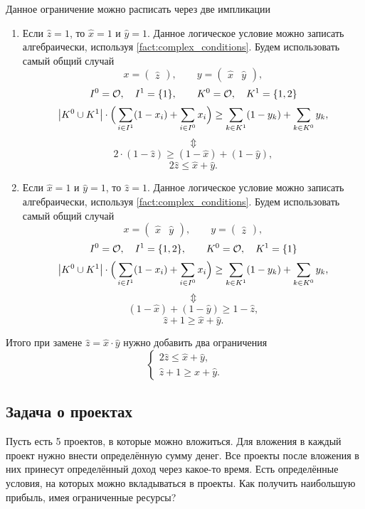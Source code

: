 Данное ограничение можно расписать через две импликации
\begin{enumerate}
	\item Если $\hat{z} = 1$, то $\hat{x} = 1$ и $\hat{y} = 1$. Данное логическое условие можно записать алгебраически, используя \cref{fact:complex_conditions}. Будем использовать самый общий случай
	\[
	x = \begin{pmatrix}\hat{z}\end{pmatrix}, \qquad y = \begin{pmatrix} \hat{x} & \hat{y} \end{pmatrix},
	\]
	\[
	I^0 = \mathcal{O}, \quad I^1 = \{1\}, \qquad K^0 = \mathcal{O}, \quad K^1 = \{1, 2\}
	\]
	\[
	\abs{K^0 \cup K^1} \cdot \Big(\sum_{i \in I^1}(1-x_i) + \sum_{i \in I^0}x_i\Big) \ge \sum_{k \in K^1}(1-y_k) + \sum_{k \in K^0}y_k,
	\]	
	\[\Updownarrow\]	
	\[
	2 \cdot (1 - \hat{z}) \ge (1 - \hat{x}) + (1 - \hat{y}),
	\]
	\[
	2\hat{z} \le \hat{x} + \hat{y}.
	\]
	
	\item Если $\hat{x} = 1$ и $\hat{y} = 1$, то $\hat{z} = 1$. Данное логическое условие можно записать алгебраически, используя \cref{fact:complex_conditions}. Будем использовать самый общий случай
	\[
	x = \begin{pmatrix}\hat{x} & \hat{y}\end{pmatrix}, \qquad y = \begin{pmatrix} \hat{z} \end{pmatrix},
	\]
	\[
	I^0 = \mathcal{O}, \quad I^1 = \{1, 2\}, \qquad K^0 = \mathcal{O}, \quad K^1 = \{1\}
	\]
	\[
	\abs{K^0 \cup K^1} \cdot \Big(\sum_{i \in I^1}(1-x_i) + \sum_{i \in I^0}x_i\Big) \ge \sum_{k \in K^1}(1-y_k) + \sum_{k \in K^0}y_k,
	\]
	\[\Updownarrow\]
	\[
	(1 - \hat{x}) + (1 - \hat{y}) \ge 1 - \hat{z},
	\]
	\[
	\hat{z} + 1 \ge \hat{x} + \hat{y}.
	\]
\end{enumerate}

Итого при замене $\hat{z} = \hat{x} \cdot \hat{y}$ нужно добавить два ограничения
\[
\boxed{\begin{cases}
		2\hat{z} \le \hat{x} + \hat{y}, \\
		\hat{z} + 1 \ge \hat{x} + \hat{y}.
\end{cases}}
\]

\subsection{Задача о проектах}

Пусть есть 5 проектов, в которые можно вложиться. Для вложения в каждый проект нужно внести определённую сумму денег. Все проекты после вложения в них принесут определённый доход через какое-то время. Есть определённые условия, на которых можно вкладываться в проекты. Как получить наибольшую прибыль, имея ограниченные ресурсы?

